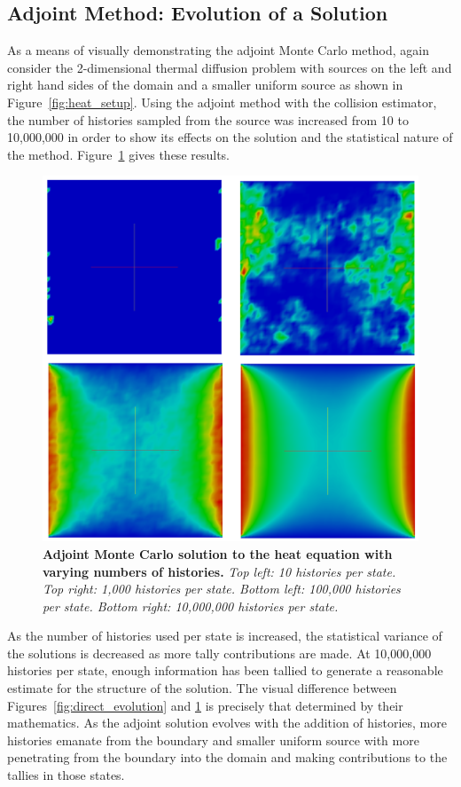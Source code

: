 \subsection{Adjoint Method: Evolution of a Solution}
\label{subsec:adjoint_evolution}
As a means of visually demonstrating the adjoint Monte Carlo method,
again consider the 2-dimensional thermal diffusion problem with
sources on the left and right hand sides of the domain and a smaller
uniform source as shown in Figure~\ref{fig:heat_setup}. Using the
adjoint method with the collision estimator, the number of histories
sampled from the source was increased from 10 to 10,000,000 in order
to show its effects on the solution and the statistical nature of the
method. Figure~\ref{fig:adjoint_evolution} gives these results.
\begin{figure}[t!]
  \begin{center}
    \includegraphics[width=6in]{chapters/mc_background/adjoint_evolution.png}
  \end{center}
  \caption{\textbf{Adjoint Monte Carlo solution to the heat equation
      with varying numbers of histories.} \textit{Top left: 10
      histories per state. Top right: 1,000 histories per
      state. Bottom left: 100,000 histories per state. Bottom right:
      10,000,000 histories per state.}}
  \label{fig:adjoint_evolution}
\end{figure}
As the number of histories used per state is increased, the
statistical variance of the solutions is decreased as more tally
contributions are made. At 10,000,000 histories per state, enough
information has been tallied to generate a reasonable estimate for the
structure of the solution. The visual difference between
Figures~\ref{fig:direct_evolution} and \ref{fig:adjoint_evolution} is
precisely that determined by their mathematics. As the adjoint
solution evolves with the addition of histories, more histories
emanate from the boundary and smaller uniform source with more
penetrating from the boundary into the domain and making contributions
to the tallies in those states.

